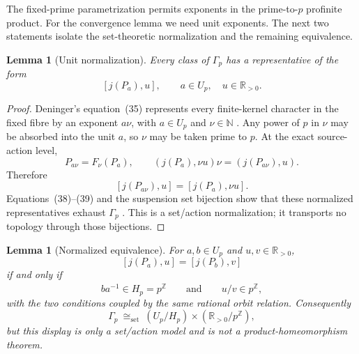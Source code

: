 \documentclass[11pt]{article}
\newtheorem{lemma}[theorem]{Lemma}
\theoremstyle{definition}
\newcommand{\R}{\mathbb{R}}
\newcommand{\Z}{\mathbb{Z}}
\newcommand{\Zhat}{\widehat{\mathbb Z}}
\begin{document}
The fixed-prime parametrization permits exponents in the prime-to-\(p\) profinite product.  For the convergence lemma we need unit exponents.  The next two statements isolate the set-theoretic normalization and the remaining equivalence.

\begin{lemma}[Unit normalization]\label{lem:normalization}
Every class of \(\Gamma_p\) has a representative of the form
\[
 [j(P_a),u],\qquad a\in U_p,\quad u\in\R_{>0}.
\]
\end{lemma}

\begin{proof}
Deninger's equation~(35) represents every finite-kernel character in the fixed fibre by an exponent \(a\nu\), with \(a\in U_p\) and \(\nu\in\mathbb N\) \cite[equation~(35), physical p.~32]{Deninger2026}.  Any power of \(p\) in \(\nu\) may be absorbed into the unit \(a\), so \(\nu\) may be taken prime to \(p\).  At the exact source-action level,
\[
 P_{a\nu}=F_\nu(P_a),\qquad
 (j(P_a),\nu u)\nu=(j(P_{a\nu}),u).
\]
Therefore
\[
 [j(P_{a\nu}),u]=[j(P_a),\nu u].
\]
Equations~(38)--(39) and the suspension set bijection show that these normalized representatives exhaust \(\Gamma_p\) \cite[equations~(38)--(39), physical p.~33]{Deninger2026}.  This is a set/action normalization; it transports no topology through those bijections.
\end{proof}

\begin{lemma}[Normalized equivalence]\label{lem:equiv}
For \(a,b\in U_p\) and \(u,v\in\R_{>0}\),
\[
 [j(P_a),u]=[j(P_b),v]
\]
if and only if
\[
 ba^{-1}\in H_p=p^{\Zhat}
 \qquad\text{and}\qquad
 u/v\in p^{\Z},
\]
with the two conditions coupled by the same rational orbit relation.  Consequently
\[
 \Gamma_p\ \cong_{\mathrm{set}}\ (U_p/H_p)\times(\R_{>0}/p^{\Z}),
\]
but this display is only a set/action model and is not a product-homeomorphism theorem.
\end{lemma}
\end{document}
